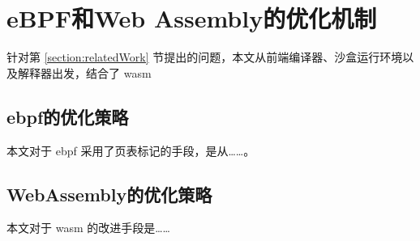 \section{eBPF和Web Assembly的优化机制}
\label{section:optimizations}
    针对第 \ref{section:relatedWork} 节提出的问题，本文从前端编译器、沙盒运行环境以及解释器出发，结合了 wasm
\subsection{ebpf的优化策略}
    本文对于 ebpf 采用了页表标记的手段，是从……。
\subsection{WebAssembly的优化策略}
    本文对于 wasm 的改进手段是……